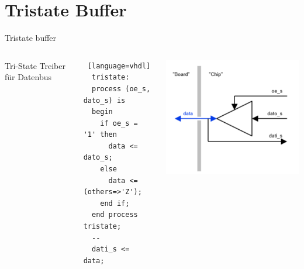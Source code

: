   \section{Tristate Buffer}
  \begin{frame} [fragile] {Tristate buffer}
    \begin{columns}
        Tri-State Treiber für Datenbus
        \begin{lstlisting} [language=vhdl]
  tristate:
  process (oe_s, dato_s) is
  begin
    if oe_s = '1' then
      data <= dato_s;
    else
      data <= (others=>'Z');
    end if;
  end process tristate;
  --
  dati_s <= data;
        \end{lstlisting}
        \includegraphics[width=\textwidth]{figs/tristate-treiber.png}
    \end{columns}
  \end{frame}

